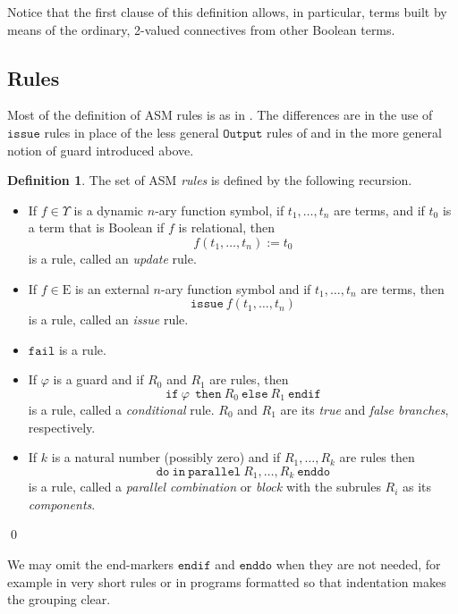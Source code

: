 \documentclass{LMCS}
\theoremstyle{definition}
\newtheorem{df}[thm]{Definition}
\newenvironment{ls}{\begin{itemize}}{\end{itemize}}
\newcommand{\E}{\mathrm{E}}
\newcommand{\U}{\Upsilon}
\newcommand{\ttt}[1]{\ensuremath{\mathtt {#1}}}
\renewcommand{\phi}{\varphi}
\begin{document}
Notice that the first clause of this definition allows, in particular,
terms built by means of the ordinary, 2-valued connectives from other
Boolean terms.

\subsection{Rules}

Most of the definition of ASM rules is as in \cite{oa2}.  The
differences are in the use of \ttt{issue} rules in place of the
less general \ttt{Output} rules of \cite{oa2} and in the more general
notion of guard introduced above.

\begin{df}
The set of ASM \emph{rules} is defined by the following recursion.
\begin{ls}
\item If $f\in\U$ is a dynamic $n$-ary function symbol, if
  $t_1,\dots,t_n$ are terms, and if $t_0$ is a term that is Boolean if
  $f$ is relational, then
$$
f(t_1,\dots,t_n):=t_0
$$
is a rule, called an \emph{update} rule.
\item If $f\in \E$ is an external $n$-ary function symbol and if
  $t_1,\dots,t_n$ are terms, then
$$
\ttt{issue}\ f(t_1,\dots,t_n)
$$
is a rule, called an \emph{issue} rule.
\item \ttt{fail} is a rule.
\item If $\phi$ is a guard and if $R_0$ and $R_1$ are rules, then
$$
\ttt{if\ } \phi\
\ttt{\ then\ } R_0 \ttt{\ else\ } R_1 \ttt{\ endif}
$$
is a rule, called a \emph{conditional} rule.  $R_0$ and $R_1$ are its
\emph{true} and \emph{false branches}, respectively.
\item If $k$ is a natural number (possibly zero) and if
  $R_1,\dots,R_k$ are rules then
$$
\ttt{do\ in\ parallel\ }R_1,\dots,R_k\ttt{\ enddo}
$$
is a rule, called a \emph{parallel combination} or \emph{block} with
the subrules $R_i$ as its \emph{components}.
\end{ls}
\qed\end{df}

We may omit the end-markers \ttt{endif} and \ttt{enddo} when they are
not needed, for example in very short rules or in programs formatted
so that indentation makes the grouping clear.
\end{document}
